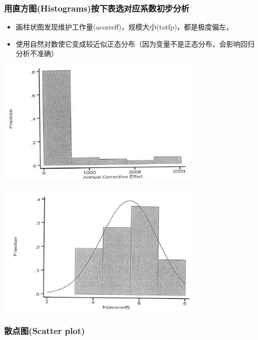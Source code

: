 \hypertarget{histogramsux7528ux76f4ux65b9ux56feux521dux6b65ux5206ux6790}{%
\subsubsection{用直方图(Histograms)按下表选对应系数初步分析}\label{histogramsux7528ux76f4ux65b9ux56feux521dux6b65ux5206ux6790}}

\begin{itemize}
\tightlist
\item
  画柱状图发现维护工作量(acorreff)，规模大小(totfp)，都是极度偏左，
\item
  使用自然对数使它变成较近似正态分布（因为变量不是正态分布，会影响回归分析不准确）
\end{itemize}


\includegraphics[width=10cm]{maxwell_f56.jpg}


\includegraphics[width=10cm]{maxwell_f58.jpg}

\hypertarget{scatter-plotux6563ux70b9ux56fe}{%
\subsubsection{散点图(Scatter
plot)}\label{scatter-plotux6563ux70b9ux56fe}}

